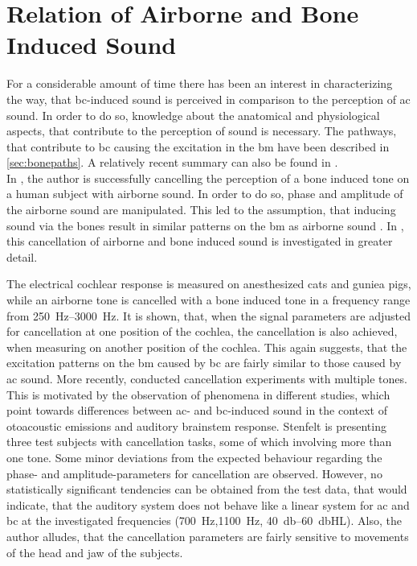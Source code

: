 \section{Relation of Airborne and Bone Induced Sound}
For a considerable amount of time there has been an interest in characterizing the way, that \gls{bc}-induced sound is perceived in comparison to the perception of  \gls{ac} sound. In order to do so, knowledge about the anatomical and physiological aspects, that contribute to the perception of sound is necessary.
The pathways, that contribute to \gls{bc} causing the excitation in the \gls{bm} have been described in \ref{sec:bonepaths}. A relatively recent summary can also be found in \citep{dauman_2013}.\\
In \citep{bekesy_1932}, the author is successfully cancelling the perception of a bone induced tone on a human subject with airborne sound. In order to do so, phase and amplitude of the airborne sound are manipulated. This led to the assumption, that inducing sound via the bones result in similar patterns on the \gls{bm} as airborne sound \citep{stenfelt_2007}.
In \citep{lowy_1942}, this cancellation of airborne and bone induced sound is investigated in greater detail. 

The electrical cochlear response is measured on anesthesized cats and guniea pigs, while an airborne tone is cancelled with a bone induced tone in a frequency range from \SIrange{250}{3000}{\hertz}. It is shown, that, when the signal parameters are adjusted for cancellation at one position of the cochlea, the cancellation is also achieved, when measuring on another position of the cochlea. This again suggests, that the excitation patterns on the \gls{bm} caused by \gls{bc} are fairly similar to those caused by \gls{ac} sound. More recently, \citep{stenfelt_2007} conducted cancellation experiments with multiple tones. This is motivated by the observation of phenomena in different studies, which point towards differences between \gls{ac}- and \gls{bc}-induced sound in the context of otoacoustic emissions and auditory brainstem response. 
Stenfelt \citep{stenfelt_2007} is presenting three test subjects with cancellation tasks, some of which involving more than one tone. Some minor deviations from the expected behaviour regarding the phase- and amplitude-parameters for cancellation are observed. However, no statistically significant tendencies can be obtained from the test data, that would indicate, that the auditory system does not behave like a linear system for \gls{ac} and \gls{bc} at the investigated frequencies (\SI{700}{\hertz},\SI{1100}{\hertz}, \SIrange{40}{60}{\decibel}HL).
Also, the author alludes, that the cancellation parameters are fairly sensitive to movements of the head and jaw of the subjects. 